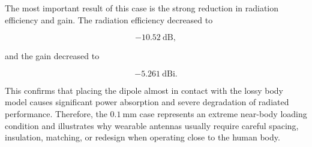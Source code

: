 The most important result of this case is the strong reduction in radiation efficiency and gain. The radiation efficiency decreased to

\[
-10.52~\mathrm{dB},
\]

and the gain decreased to

\[
-5.261~\mathrm{dBi}.
\]

This confirms that placing the dipole almost in contact with the lossy body model causes significant power absorption and severe degradation of radiated performance. Therefore, the \(0.1~\mathrm{mm}\) case represents an extreme near-body loading condition and illustrates why wearable antennas usually require careful spacing, insulation, matching, or redesign when operating close to the human body.
